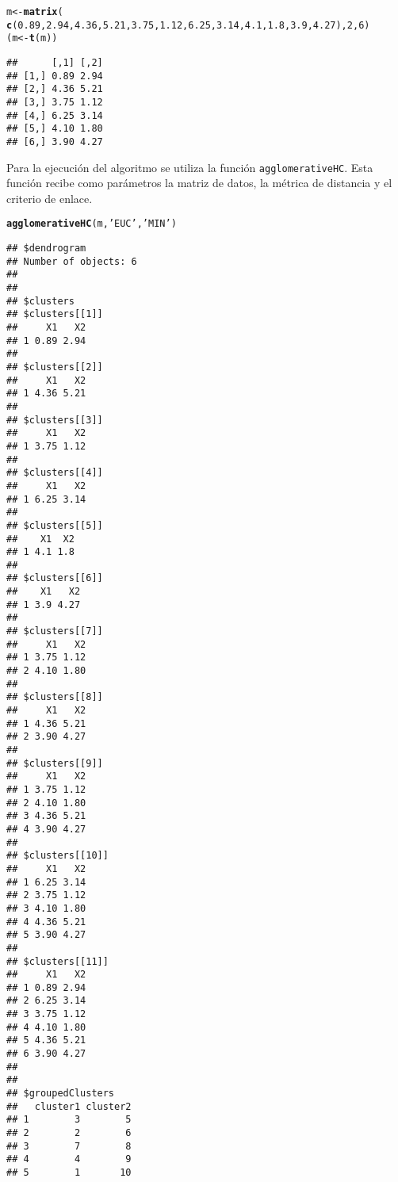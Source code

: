 \documentclass[12pt]{report}\usepackage[]{graphicx}\usepackage[dvipsnames]{xcolor}
\makeatletter
\newcommand{\hlnum}[1]{\textcolor[rgb]{0.686,0.059,0.569}{#1}}%
\newcommand{\hlstr}[1]{\textcolor[rgb]{0.192,0.494,0.8}{#1}}%
\newcommand{\hlstd}[1]{\textcolor[rgb]{0.345,0.345,0.345}{#1}}%
\newcommand{\hlkwb}[1]{\textcolor[rgb]{0.69,0.353,0.396}{#1}}%
\newcommand{\hlkwd}[1]{\textcolor[rgb]{0.737,0.353,0.396}{\textbf{#1}}}%
\newenvironment{kframe}{%
 \def\at@end@of@kframe{}%
 \ifinner\ifhmode%
  \def\at@end@of@kframe{\end{minipage}}%
  \begin{minipage}{\columnwidth}%
 \fi\fi%
 \def\FrameCommand##1{\hskip\@totalleftmargin \hskip-\fboxsep
 \colorbox{shadecolor}{##1}\hskip-\fboxsep
     \hskip-\linewidth \hskip-\@totalleftmargin \hskip\columnwidth}%
 \MakeFramed {\advance\hsize-\width
   \@totalleftmargin\z@ \linewidth\hsize
   \@setminipage}}%
 {\par\unskip\endMakeFramed%
 \at@end@of@kframe}
\newenvironment{knitrout}{}{} %
\makeatother
\begin{document}
\begin{knitrout}
\color{fgcolor}\begin{kframe}
\begin{alltt}
\hlstd{m} \hlkwb{<-} \hlkwd{matrix}\hlstd{(}
        \hlkwd{c}\hlstd{(}\hlnum{0.89}\hlstd{,}\hlnum{2.94}\hlstd{,} \hlnum{4.36}\hlstd{,}\hlnum{5.21}\hlstd{,} \hlnum{3.75}\hlstd{,}\hlnum{1.12}\hlstd{,} \hlnum{6.25}\hlstd{,}\hlnum{3.14}\hlstd{,} \hlnum{4.1}\hlstd{,}\hlnum{1.8}\hlstd{,} \hlnum{3.9}\hlstd{,}\hlnum{4.27}\hlstd{),}\hlnum{2}\hlstd{,}\hlnum{6}\hlstd{)}
\hlstd{(m} \hlkwb{<-} \hlkwd{t}\hlstd{(m))}
\end{alltt}
\begin{verbatim}
##      [,1] [,2]
## [1,] 0.89 2.94
## [2,] 4.36 5.21
## [3,] 3.75 1.12
## [4,] 6.25 3.14
## [5,] 4.10 1.80
## [6,] 3.90 4.27
\end{verbatim}
\end{kframe}
\end{knitrout}
				
				Para la ejecución del algoritmo se utiliza la función \texttt{agglomerativeHC}. Esta función recibe como parámetros la matriz de datos, la métrica de distancia y el criterio de enlace.
				
\begin{knitrout}
\color{fgcolor}\begin{kframe}
\begin{alltt}
\hlkwd{agglomerativeHC}\hlstd{(m,} \hlstr{'EUC'}\hlstd{,} \hlstr{'MIN'}\hlstd{)}
\end{alltt}
\begin{verbatim}
## $dendrogram
## Number of objects: 6 
## 
## 
## $clusters
## $clusters[[1]]
##     X1   X2
## 1 0.89 2.94
## 
## $clusters[[2]]
##     X1   X2
## 1 4.36 5.21
## 
## $clusters[[3]]
##     X1   X2
## 1 3.75 1.12
## 
## $clusters[[4]]
##     X1   X2
## 1 6.25 3.14
## 
## $clusters[[5]]
##    X1  X2
## 1 4.1 1.8
## 
## $clusters[[6]]
##    X1   X2
## 1 3.9 4.27
## 
## $clusters[[7]]
##     X1   X2
## 1 3.75 1.12
## 2 4.10 1.80
## 
## $clusters[[8]]
##     X1   X2
## 1 4.36 5.21
## 2 3.90 4.27
## 
## $clusters[[9]]
##     X1   X2
## 1 3.75 1.12
## 2 4.10 1.80
## 3 4.36 5.21
## 4 3.90 4.27
## 
## $clusters[[10]]
##     X1   X2
## 1 6.25 3.14
## 2 3.75 1.12
## 3 4.10 1.80
## 4 4.36 5.21
## 5 3.90 4.27
## 
## $clusters[[11]]
##     X1   X2
## 1 0.89 2.94
## 2 6.25 3.14
## 3 3.75 1.12
## 4 4.10 1.80
## 5 4.36 5.21
## 6 3.90 4.27
## 
## 
## $groupedClusters
##   cluster1 cluster2
## 1        3        5
## 2        2        6
## 3        7        8
## 4        4        9
## 5        1       10
\end{verbatim}
\end{kframe}
\end{knitrout}
				
\end{document}

